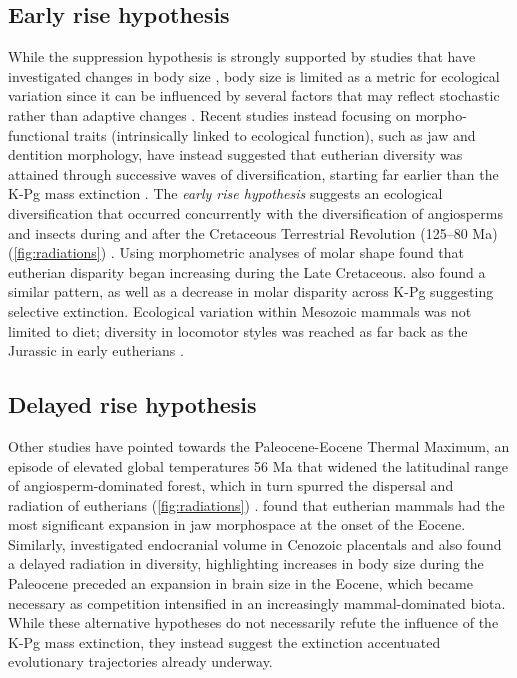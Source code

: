 \documentclass[titlepage]{article}
\begin{document}
\subsection{Early rise hypothesis}
While the suppression hypothesis is strongly supported by studies that have investigated changes in body size \citep{alroy_fossil_1999,slater_phylogenetic_2013}, body size is limited as a metric for ecological variation since it can be influenced by several factors that may reflect stochastic rather than adaptive changes \citep{grossnickle_feeding_2020}. 
Recent studies instead focusing on morpho-functional traits (intrinsically linked to ecological function), such as jaw and dentition morphology, have instead suggested that eutherian diversity was attained through successive waves of diversification, starting far earlier than the K-Pg mass extinction \citep{grossnickle_untangling_2019}.
The \textit{early rise hypothesis} suggests an ecological diversification that occurred concurrently with the diversification of angiosperms and insects during and after the Cretaceous Terrestrial Revolution (125--80 Ma) (\autoref{fig:radiations}) \citep{meredith_impacts_2011,benton_angiosperm_2022}. 
Using morphometric analyses of molar shape \cite{grossnickle_therian_2016} found that eutherian disparity began increasing during the Late Cretaceous.
\cite{wilson_mammals_2013} also found a similar pattern, as well as a decrease in molar disparity across K-Pg suggesting selective extinction.
Ecological variation within Mesozoic mammals was not limited to diet; diversity in locomotor styles was reached as far back as the Jurassic in early eutherians \citep{chen_assembly_2019}. 
\subsection{Delayed rise hypothesis}
Other studies have pointed towards the Paleocene-Eocene Thermal Maximum, an episode of elevated global temperatures 56 Ma that widened the latitudinal range of angiosperm-dominated forest, which in turn spurred the dispersal and radiation of eutherians (\autoref{fig:radiations}) \citep{bininda-emonds_delayed_2007}. 
\cite{benevento_patterns_2019} found that eutherian mammals had the most significant expansion in jaw morphospace at the onset of the Eocene.
Similarly, \cite{bertrand_brawn_2022} investigated endocranial volume in Cenozoic placentals and also found a delayed radiation in diversity, highlighting increases in body size during the Paleocene preceded an expansion in brain size in the Eocene, which became necessary as competition intensified in an increasingly mammal-dominated biota. 
While these alternative hypotheses do not necessarily refute the influence of the K-Pg mass extinction, they instead suggest the extinction accentuated evolutionary trajectories already underway. 
\end{document}
